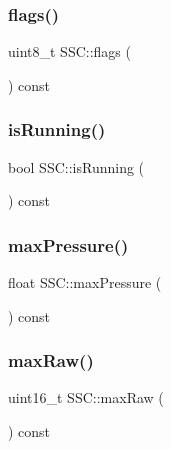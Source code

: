 \mbox{\label{class_s_s_c_afabea8e8e41af4842e5b4621cb4ce5f2}} 
\subsubsection{\texorpdfstring{flags()}{flags()}}
{\footnotesize\ttfamily uint8\+\_\+t S\+S\+C\+::flags (\begin{DoxyParamCaption}{ }\end{DoxyParamCaption}) const\hspace{0.3cm}{\ttfamily [inline]}}

\mbox{\label{class_s_s_c_a13b6cd9dec0ef74674bcb48ba07119db}} 
\subsubsection{\texorpdfstring{is\+Running()}{isRunning()}}
{\footnotesize\ttfamily bool S\+S\+C\+::is\+Running (\begin{DoxyParamCaption}{ }\end{DoxyParamCaption}) const\hspace{0.3cm}{\ttfamily [inline]}}

\mbox{\label{class_s_s_c_a4e6e3ab38e6ce15291404abe00b5d5bc}} 
\subsubsection{\texorpdfstring{max\+Pressure()}{maxPressure()}}
{\footnotesize\ttfamily float S\+S\+C\+::max\+Pressure (\begin{DoxyParamCaption}{ }\end{DoxyParamCaption}) const\hspace{0.3cm}{\ttfamily [inline]}}

\mbox{\label{class_s_s_c_a930725a21edf40efe0b2dc3dadc45368}} 
\subsubsection{\texorpdfstring{max\+Raw()}{maxRaw()}}
{\footnotesize\ttfamily uint16\+\_\+t S\+S\+C\+::max\+Raw (\begin{DoxyParamCaption}{ }\end{DoxyParamCaption}) const\hspace{0.3cm}{\ttfamily [inline]}}

